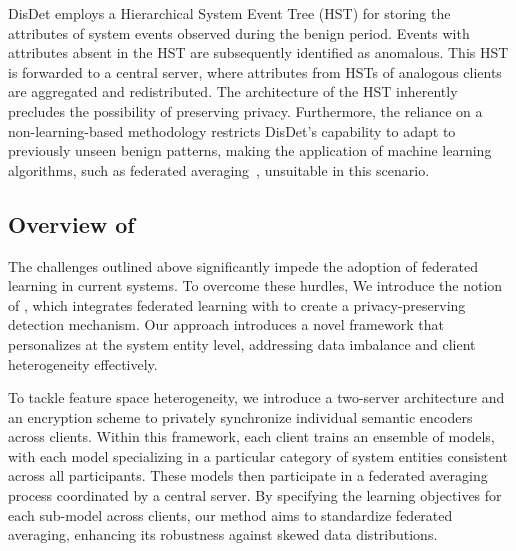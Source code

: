  DisDet employs a Hierarchical System Event Tree (HST) for storing the attributes of system events observed during the benign period. Events with attributes absent in the HST are subsequently identified as anomalous. This HST is forwarded to a central server, where attributes from HSTs of analogous clients are aggregated and redistributed. The architecture of the HST inherently precludes the possibility of preserving privacy. Furthermore, the reliance on a non-learning-based methodology restricts DisDet's capability to adapt to previously unseen benign patterns, making the application of machine learning algorithms, such as federated averaging~\cite{mcmahan2017communication}, unsuitable in this scenario.


\subsection{Overview of \Sys}
The challenges outlined above significantly impede the adoption of federated learning in current systems. To overcome these hurdles, We introduce the notion of \fpgl , which integrates federated learning with \grl to create a privacy-preserving detection mechanism. Our approach introduces a novel framework that personalizes \grl at the system entity level, addressing data imbalance and client heterogeneity effectively.

To tackle feature space heterogeneity, we introduce a two-server architecture and an encryption scheme to privately synchronize individual semantic encoders across clients. Within this framework, each client trains an ensemble of \gnnshort models, with each model specializing in a particular category of system entities consistent across all participants. These models then participate in a federated averaging process coordinated by a central server. By specifying the learning objectives for each sub-model across clients, our method aims to standardize federated averaging, enhancing its robustness against skewed data distributions.

